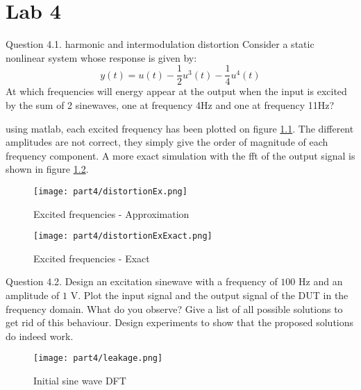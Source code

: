 \setcounter{secnumdepth}{1}

\chapter{Lab 4}

\begin{Task}{Question 4.1. harmonic and intermodulation distortion}
    Consider a static nonlinear system whose response is given by:\\
    \begin{equation}
        y(t) = u(t) - \frac{1}{2}u^3(t) - \frac{1}{4} u^4(t)
    \end{equation}
    At which frequencies will energy appear at the output when the input is excited by the sum of 2 sinewaves, one at frequency 4Hz and one at frequency 11Hz?    
\end{Task}

using matlab, each excited frequency has been plotted on figure \ref{fig:distortionEx}. The different amplitudes are not correct, they simply give the order of magnitude of each frequency component. A more exact simulation with the fft of the output signal is shown in figure \ref{fig:distortionExExact}.

\begin{figure}[H]
    \centering
    \texttt{[image: part4/distortionEx.png]}
    \caption{Excited frequencies - Approximation}
    \label{fig:distortionEx}
\end{figure}

\begin{figure}[H]
    \centering
    \texttt{[image: part4/distortionExExact.png]}
    \caption{Excited frequencies - Exact}
    \label{fig:distortionExExact}
\end{figure}

\begin{Task}{Question 4.2.}
    Design an excitation sinewave with a frequency of $100$ Hz and an amplitude of $1$ V. Plot the input signal and the output signal of the DUT in the frequency domain. What do you observe? Give a list of all possible solutions to get rid of this behaviour. Design experiments to show that the proposed solutions do indeed work.
\end{Task}

\begin{figure}[H]
    \centering
    \texttt{[image: part4/leakage.png]}
    \caption{Initial sine wave DFT}
    \label{fig:leakage}
\end{figure}

